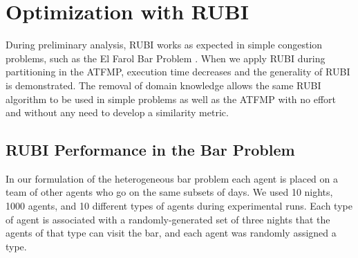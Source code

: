 \documentclass[smallcondensed]{svjour3}
\begin{document}
\section{Optimization with RUBI} \label{sec:RUBI Results}
During preliminary analysis, RUBI works as expected in simple congestion problems, such as the El Farol Bar Problem \cite{BarProblem}. When we apply RUBI during partitioning in the ATFMP, execution time decreases and the generality of RUBI is demonstrated. The removal of domain knowledge allows the same RUBI algorithm to be used in simple problems as well as the ATFMP with no effort and without any need to develop a similarity metric.


\subsection{RUBI Performance in the Bar Problem}

In our formulation of the heterogeneous bar problem each agent is placed on a team of other agents who go on the same subsets of days. We used 10 nights, 1000 agents, and 10 different types of agents during experimental runs. Each type of agent is associated with a randomly-generated set of three nights that the agents of that type can visit the bar, and each agent was randomly assigned a type. %
\end{document}
